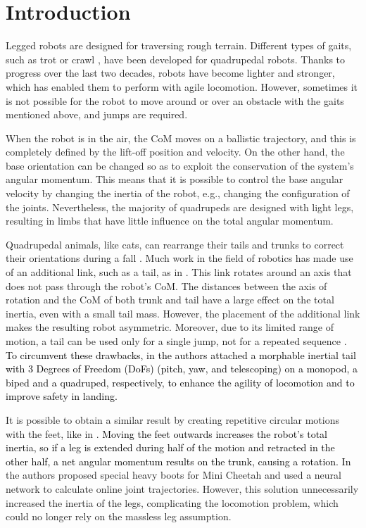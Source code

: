 \documentclass[sensors,article,accept,pdftex,moreauthors]{Definitions/mdpi}
\newcommand{\MF}[1]{\textcolor{black}{#1}}
\begin{document}
\section{Introduction}\label{sec:introduction}
Legged robots are designed for traversing rough terrain.
Different types of gaits, such as trot \MF{\cite{barasuol2013reactive}} or crawl \MF{\cite{focchi2020heuristic}}, have been developed for quadrupedal robots. 
Thanks to progress over the last two decades, robots have become lighter and stronger, which has enabled them to perform with agile locomotion.
However, sometimes it is not possible for the robot to move around or over an obstacle with the gaits mentioned above, and jumps are required. 

When the robot is in the air, the CoM moves on a ballistic trajectory, and this is completely defined by the lift-off position and velocity. On the other hand, the base orientation can be changed so as to exploit the conservation of the system's angular momentum. This means that it is possible to control the base angular velocity by changing the inertia of the robot, e.g., changing the configuration of the joints. Nevertheless, the majority of quadrupeds are designed with light legs, resulting in limbs that have little influence on the total angular momentum.

Quadrupedal animals, like cats, can rearrange their tails and trunks to correct their orientations during a fall \cite{kane1969dynamical}.
Much work in the field of robotics has made use of an additional link, such as a tail, as in \cite{chu2019null,wenger2016frontal}.
This link rotates around an axis that does not pass through the robot's CoM. The distances between the axis of rotation and the CoM of both trunk and tail have a large effect on the total inertia, even with a small tail mass.
However, the placement of the additional link makes the resulting robot asymmetric. Moreover, due to its limited range of motion, a tail can be used only for a single jump, not for a repeated sequence \cite{johnson2012tail}.
\MF{To circumvent these drawbacks, in \cite{an2022design,an2020development,tang2022towards} the authors attached a morphable inertial tail with 3 Degrees of Freedom (DoFs) (pitch, yaw, and telescoping) on a monopod, a biped and a quadruped, respectively, to enhance the agility of locomotion and to improve safety in landing.}


It is possible to obtain a similar result by creating repetitive circular motions with the feet, like in \cite{hoffman2021exploiting}. \MF{Moving the feet outwards increases the robot's total inertia, so if a leg is extended during half of the motion and retracted in the other half, a net angular momentum results on the trunk, causing a rotation. In \cite{kurtz2022mini}} the authors proposed special heavy boots for Mini Cheetah and used a neural network to calculate online joint trajectories. However, this solution unnecessarily increased the inertia of the legs, complicating the locomotion problem, which could no longer rely on the massless leg assumption. 
\end{document}
